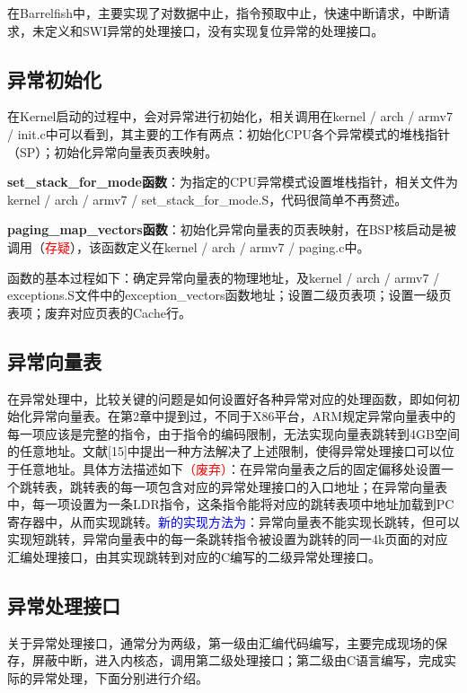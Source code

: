 \documentclass[a4paper, 12pt]{report}
\begin{document}
    在Barrelfish中，主要实现了对数据中止，指令预取中止，快速中断请求，中断请求，未定义和SWI异常的处理接口，没有实现复位异常的处理接口。
    
    \subsection{异常初始化}
    
    在Kernel启动的过程中，会对异常进行初始化，相关调用在kernel / arch / armv7 / init.c中可以看到，其主要的工作有两点：初始化CPU各个异常模式的堆栈指针（SP）；初始化异常向量表页表映射。
    
    \textbf{set\_stack\_for\_mode函数}：为指定的CPU异常模式设置堆栈指针，相关文件为kernel / arch / armv7 / set\_stack\_for\_mode.S，代码很简单不再赘述。
    
    \textbf{paging\_map\_vectors函数}：初始化异常向量表的页表映射，在BSP核启动是被调用（\textcolor{red}{存疑}），该函数定义在kernel / arch / armv7 / paging.c中。
    
    函数的基本过程如下：确定异常向量表的物理地址，及kernel / arch / armv7 / exceptions.S文件中的exception\_vectors函数地址；设置二级页表项；设置一级页表项；废弃对应页表的Cache行。
    
    \subsection{异常向量表}
    
    在异常处理中，比较关键的问题是如何设置好各种异常对应的处理函数，即如何初始化异常向量表。在第2章中提到过，不同于X86平台，ARM规定异常向量表中的每一项应该是完整的指令，由于指令的编码限制，无法实现向量表跳转到4GB空间的任意地址。文献[15]中提出一种方法解决了上述限制，使得异常处理接口可以位于任意地址。具体方法描述如下\textcolor{red}{（废弃）}：在异常向量表之后的固定偏移处设置一个跳转表，跳转表的每一项包含对应的异常处理接口的入口地址；在异常向量表中，每一项设置为一条LDR指令，这条指令能将对应的跳转表项中地址加载到PC寄存器中，从而实现跳转。\textcolor{blue}{新的实现方法为}：异常向量表不能实现长跳转，但可以实现短跳转，异常向量表中的每一条跳转指令被设置为跳转的同一4k页面的对应汇编处理接口，由其实现跳转到对应的C编写的二级异常处理接口。
    
    \subsection{异常处理接口}
    
    关于异常处理接口，通常分为两级，第一级由汇编代码编写，主要完成现场的保存，屏蔽中断，进入内核态，调用第二级处理接口；第二级由C语言编写，完成实际的异常处理，下面分别进行介绍。
    
\end{document}
